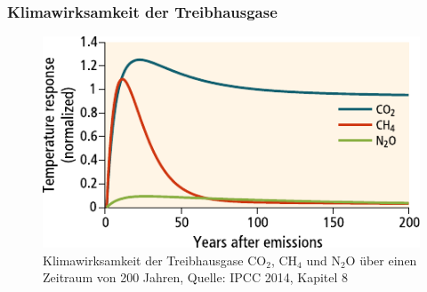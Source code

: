 \begin{frame}
	\frametitle{Klimawirksamkeit der Treibhausgase}

		\begin{figure}
			\centering
			  \includegraphics[width=.7\linewidth]{bilder/ghg-forcings-over-time.pdf}
			  \caption{Klimawirksamkeit der Treibhausgase CO$_2$, CH$_4$ und N$_2$O über einen Zeitraum von 200 Jahren, Quelle: IPCC 2014, Kapitel 8}
		\end{figure}


\end{frame}
